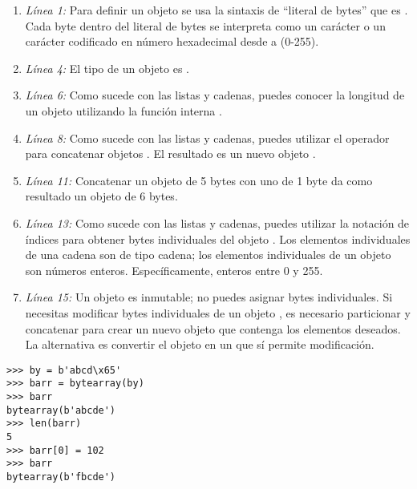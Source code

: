 \begin{enumerate}

\item \emph{Línea 1:} Para definir un objeto  se usa la sintaxis de ``literal de bytes'' que es . Cada byte dentro del literal de bytes se interpreta como un carácter  o un carácter codificado en número hexadecimal desde  a \codigo{\\xFF} (0-255).

\item \emph{Línea 4:} El tipo de un objeto  es .

\item \emph{Línea 6:} Como sucede con las listas y cadenas, puedes conocer la longitud de un objeto  utilizando la función interna .

\item \emph{Línea 8:} Como sucede con las listas y cadenas, puedes utilizar el operador \codigo{+} para concatenar objetos . El resultado es un nuevo objeto .

\item \emph{Línea 11:} Concatenar un objeto  de 5 bytes con uno de 1 byte da como resultado un objeto  de 6 bytes.

\item \emph{Línea 13:} Como sucede con las listas y cadenas, puedes utilizar la notación de índices para obtener bytes individuales del objeto . Los elementos individuales de una cadena son de tipo cadena; los elementos individuales de un objeto  son números enteros. Específicamente, enteros entre 0 y 255.

\item \emph{Línea 15:} Un objeto  es inmutable; no puedes asignar bytes individuales. Si necesitas modificar bytes individuales de un objeto , es necesario particionar y concatenar para crear un nuevo objeto  que contenga los elementos deseados. La alternativa es convertir el objeto  en un  que sí permite modificación.

\end{enumerate}

\noindent\begin{minipage}{\textwidth}
\begin{lstlisting}[mathescape=True]
>>> by = b'abcd\x65'
>>> barr = bytearray(by)
>>> barr
bytearray(b'abcde')
>>> len(barr)
5
>>> barr[0] = 102
>>> barr
bytearray(b'fbcde')
\end{lstlisting}
\end{minipage}

